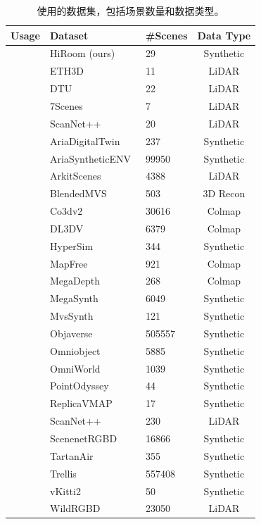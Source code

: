 \begin{table}[ht]
\centering
\caption{\longname{}使用的数据集，包括场景数量和数据类型。}
\label{tab:datasets}
\begin{tabular}{l|llc}
\toprule
\textbf{Usage} & \textbf{Dataset} & \textbf{\#Scenes} & \textbf{Data Type} \\
\midrule
{} 
  & HiRoom (ours)        & 29  & Synthetic \\
  & ETH3D~\citep{schops2017eth3d}     & 11  & LiDAR \\
  & DTU~\citep{aanaes2016dtu}         & 22  & LiDAR \\
  & 7Scenes~\citep{shotton2013sevenscene} & 7   & LiDAR \\
  & ScanNet++~\citep{yeshwanth2023scannet++} & 20  & LiDAR \\
\midrule
{}
  & AriaDigitalTwin~\citep{pan2023aria} & 237   & Synthetic \\
  & AriaSyntheticENV~\citep{pan2023aria} & 99950  &  Synthetic \\
  & ArkitScenes~\citep{baruch2021arkitscenes}      & 4388 & LiDAR \\
  & BlendedMVS~\citep{yao2020blendedmvs} & 503 & 3D Recon \\
  & Co3dv2~\citep{reizenstein2021common} & 30616 & Colmap\\
  & DL3DV~\citep{ling2024dl3dv} & 6379 & Colmap \\
  & HyperSim~\citep{roberts2021hypersim} & 344 & Synthetic \\
  & MapFree~\citep{arnold2022map} & 921 & Colmap \\
  & MegaDepth~\citep{li2018megadepth} & 268 & Colmap \\ 
  & MegaSynth~\citep{jiang2025megasynth} & 6049 & Synthetic \\ 
  & MvsSynth~\citep{DeepMVS} & 121 & Synthetic \\
  & Objaverse~\citep{deitke2023objaverse} & 505557 & Synthetic \\ 
  & Omniobject~\citep{wu2023omniobject3d} & 5885 & Synthetic\\ 
  & OmniWorld~\citep{zhou2025omniworld} & 1039 & Synthetic\\ 
  & PointOdyssey~\citep{zheng2023pointodyssey} & 44 & Synthetic \\ 
  & ReplicaVMAP~\citep{straub2019replica} & 17 & Synthetic \\
  & ScanNet++~\citep{yeshwanth2023scannet++} & 230 & LiDAR \\
  & ScenenetRGBD~\citep{mccormac2017scenenet} & 16866 & Synthetic \\
  & TartanAir~\citep{tartanair2020iros} & 355 & Synthetic \\
  & Trellis~\citep{xiang2024structured} & 557408 & Synthetic \\
  & vKitti2~\citep{cabon2020vkitti2} & 50 & Synthetic \\
  & WildRGBD~\citep{xia2024rgbd} & 23050 & LiDAR \\
\bottomrule
\end{tabular}

\end{table}

